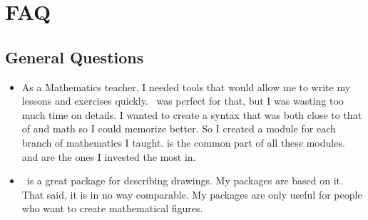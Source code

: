 \section{FAQ}

\subsection{General Questions}
\begin{itemize}\setlength{\itemsep}{10pt}
\item {} As a Mathematics teacher, I needed tools that would allow me to write my lessons and exercises quickly. \TIKZ\ was perfect for that, but I was wasting too much time on details. I wanted to create a syntax that was both close to that of \LATEX and math so I could memorize better. So I created a module for each branch of mathematics I taught.  is the common part of all these modules.  and  are the ones I invested the most in.

\item  {} \TIKZ\ is a great package for describing drawings. My packages are based on it. That said, it is in no way comparable. My packages are only useful for people who want to create mathematical figures.
\end{itemize}

